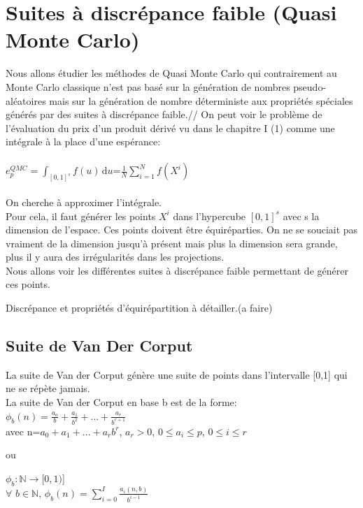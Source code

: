 \documentclass[12pt]{report}
\begin{document}
\section{Suites à discrépance faible (Quasi Monte Carlo)}
Nous allons étudier les méthodes de Quasi Monte Carlo qui contrairement au Monte Carlo classique n'est pas basé sur la génération de nombres pseudo-aléatoires mais sur la génération de nombre déterministe aux propriétés spéciales générés par des suites à discrépance faible.//
On peut voir le problème de l'évaluation du prix d'un produit dérivé vu dans le chapitre I (1)  comme une intégrale à la place d'une espérance:\\\\
$e_p^{QMC}=$$\int_{[0,1]^s} f(u) \, \mathrm du$=$\frac{1}{N}\sum_{i=1}^{N}f(X^i)$\\\\
On cherche à approximer l'intégrale.\\
Pour cela, il faut générer les points $X^i$ dans l'hypercube $[0,1]^s$ avec s la dimension de l'espace.
Ces points doivent être équiréparties.
On ne se souciait pas vraiment de la dimension jusqu'à présent mais plus la dimension sera grande, plus il y aura des irrégularités dans les projections.\\
Nous allons voir les différentes suites à discrépance faible permettant de générer ces points.


Discrépance et propriétés d'équirépartition à détailler.(a faire)
\subsection{Suite de Van Der Corput}

La suite de Van der Corput génère une suite de points dans l'intervalle [0,1] qui ne se répète jamais.\\
La suite de Van der Corput en base b est de la forme:\\
$\phi_b(n)=\frac{a_o}{b}+\frac{a_1}{b^2}+...+\frac{a_r}{b^{r+1}}$\\ avec n=$a_0+a_1+...+a_rb^r$, $a_r>0$, $0\leq a_i \leq p$, $0\leq i \leq r$
\begin{center}
	ou \\
\end{center}
$\phi_b: \mathbb{N} \rightarrow[0,1)$]\\
$\forall$ $ b\in \mathbb{N}$, $\phi_b(n)=\sum_{i=0}^{I}\frac{a_i(n,b)}{b^{i-1}}$\\\\
\end{document}
